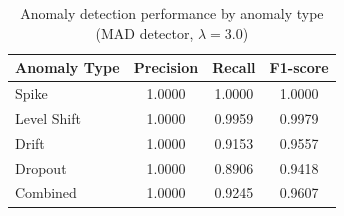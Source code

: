 \begin{table}[htbp]
\centering
\caption{Anomaly detection performance by anomaly type (MAD detector, $\lambda=3.0$)}
\begin{tabular}{lccc}
\toprule
Anomaly Type & Precision & Recall & F1-score \\
\midrule
Spike & 1.0000 & 1.0000 & 1.0000 \\
Level Shift & 1.0000 & 0.9959 & 0.9979 \\
Drift & 1.0000 & 0.9153 & 0.9557 \\
Dropout & 1.0000 & 0.8906 & 0.9418 \\
Combined & 1.0000 & 0.9245 & 0.9607 \\
\bottomrule
\end{tabular}
\end{table}
